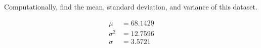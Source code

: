 Computationally, find the mean, standard deviation, and variance of this dataset.

\begin{solution}
    \begin{align*}
        \mu &= 68.1429 \\
        \sigma^2 &= 12.7596 \\
        \sigma &= 3.5721
    \end{align*}
\end{solution}